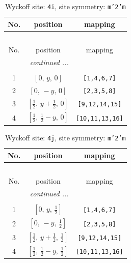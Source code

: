 \documentclass[fleqn,8pt]{jsarticle}
\begin{document}
\renewcommand{\arraystretch}{1.2}
\begin{longtable}{ccc}
\caption{Wyckoff site: {\tt 4i}, site symmetry: {\tt m'2'm}}
 \\
 \hline \hline
No. & position & mapping \\ \hline \endfirsthead

\multicolumn{2}{l}{\tablename\ \thetable{}} \\
 \hline \hline
No. & position & mapping \\ \hline \endhead

 \hline \hline
\multicolumn{2}{r}{\footnotesize\it continued ...} \\ \endfoot

 \hline \hline
\multicolumn{2}{r}{} \\ \endlastfoot

1 & $\left[ 0,\, y,\, 0 \right]$ & {\tt [1,4,6,7]} \\ \hline
2 & $\left[ 0,\, - y,\, 0 \right]$ & {\tt [2,3,5,8]} \\ \hline
3 & $\left[ \frac{1}{2},\, y + \frac{1}{2},\, 0 \right]$ & {\tt [9,12,14,15]} \\ \hline
4 & $\left[ \frac{1}{2},\, \frac{1}{2} - y,\, 0 \right]$ & {\tt [10,11,13,16]} \\
\end{longtable}
\renewcommand{\arraystretch}{1.2}
\begin{longtable}{ccc}
\caption{Wyckoff site: {\tt 4j}, site symmetry: {\tt m'2'm}}
 \\
 \hline \hline
No. & position & mapping \\ \hline \endfirsthead

\multicolumn{2}{l}{\tablename\ \thetable{}} \\
 \hline \hline
No. & position & mapping \\ \hline \endhead

 \hline \hline
\multicolumn{2}{r}{\footnotesize\it continued ...} \\ \endfoot

 \hline \hline
\multicolumn{2}{r}{} \\ \endlastfoot

1 & $\left[ 0,\, y,\, \frac{1}{2} \right]$ & {\tt [1,4,6,7]} \\ \hline
2 & $\left[ 0,\, - y,\, \frac{1}{2} \right]$ & {\tt [2,3,5,8]} \\ \hline
3 & $\left[ \frac{1}{2},\, y + \frac{1}{2},\, \frac{1}{2} \right]$ & {\tt [9,12,14,15]} \\ \hline
4 & $\left[ \frac{1}{2},\, \frac{1}{2} - y,\, \frac{1}{2} \right]$ & {\tt [10,11,13,16]} \\
\end{longtable}
\end{document}
